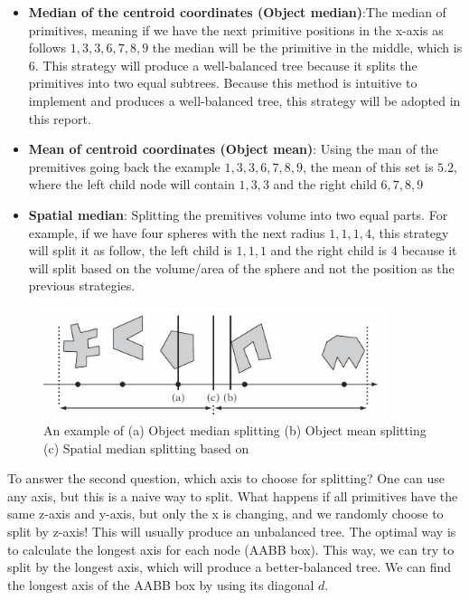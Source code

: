 \documentclass[11pt,a4paper]{article}
\begin{document}
\begin{itemize}
\item \textbf{Median of the centroid coordinates (Object median)}:The median of primitives, meaning if we have the next primitive positions in the x-axis as follows ${1, 3, 3, 6, 7, 8, 9}$ the median will be the primitive in the middle, which is $6$. This strategy will produce a well-balanced tree because it splits the primitives into two equal subtrees. Because this method is intuitive to implement and produces a well-balanced tree, this strategy will be adopted in this report. 


\item  \textbf{Mean of centroid coordinates (Object mean)}: Using the man of the premitives going back the example ${1, 3, 3, 6, 7, 8, 9}$, the mean of this set is $5.2$, where the left child node will contain ${1,3,3}$ and the right child ${6,7,8,9}$

\item  \textbf{Spatial median}: Splitting the premitives volume into two equal parts. For example, if we have four spheres with the next radius ${1,1,1,4}$, this strategy will split it as follow, the left child is ${1,1,1}$ and the right child is ${4}$ because it will split based on the volume/area of the sphere and not the position as the previous strategies. 

\end{itemize}


\begin{figure}[H]	
     \centering
     \captionsetup{justification=centering,margin=2cm}
     \includegraphics[width=10cm]{images/bvh_split.png}
     \caption{An example of (a) Object median splitting (b) Object mean splitting (c) Spatial median
splitting based on \protect\cite{Ericson2004}}
        \label{fig:dice}
\end{figure}


To answer the second question, which axis to choose for splitting? One can use any axis, but this is a naive way to split. What happens if all primitives have the same z-axis and y-axis, but only the x is changing, and we randomly choose to split by z-axis! This will usually produce an unbalanced tree. The optimal way is to calculate the longest axis for each node (AABB box). This way, we can try to split by the longest axis, which will produce a better-balanced tree. We can find the longest axis of the AABB box by using its diagonal $d$.  
\end{document}
